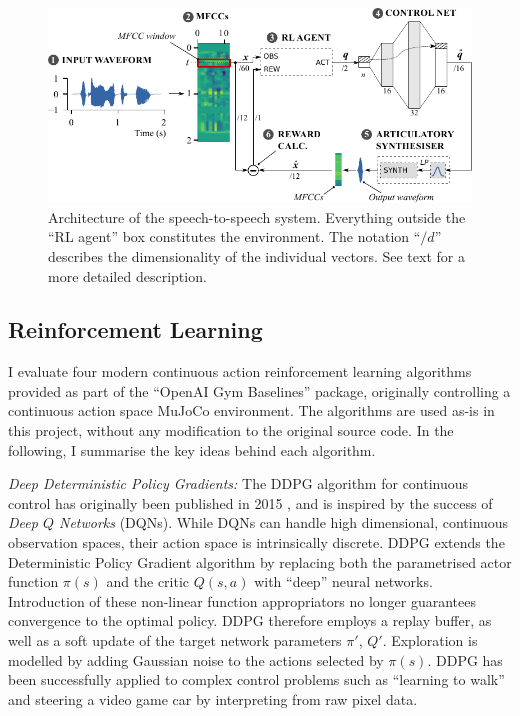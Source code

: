 \documentclass[letterpaper,10pt,conference]{ieeeconf}
\begin{document}
\begin{figure}[t]
	\centering
	\includegraphics{media/overview.pdf}
	\caption{Architecture of the speech-to-speech system. Everything outside the \enquote{RL agent} box constitutes the environment. The notation \enquote{$/d$} describes the dimensionality of the individual vectors. See text for a more detailed description.}
	\label{fig:architecture}
\end{figure}

\subsection{Reinforcement Learning}

I evaluate four modern continuous action reinforcement learning algorithms provided as part of the \enquote{OpenAI Gym Baselines} package, originally controlling a continuous action space MuJoCo environment. The algorithms are used as-is in this project, without any modification to the original source code. In the following, I summarise the key ideas behind each algorithm.

\emph{Deep Deterministic Policy Gradients:} The DDPG algorithm for continuous control has originally been published in 2015 \cite{lillicrap2015continuous}, and is inspired by the success of \emph{Deep $Q$ Networks} (DQNs). While DQNs can handle high dimensional, continuous observation spaces, their action space is intrinsically discrete. DDPG extends the Deterministic Policy Gradient algorithm by replacing both the parametrised actor function $\pi(s)$ and the critic $Q(s, a)$ with \enquote{deep} neural networks. Introduction of these non-linear function appropriators no longer guarantees convergence to the optimal policy. DDPG therefore employs a replay buffer, as well as a soft update of the target network parameters $\pi'$, $Q'$. Exploration is modelled by adding Gaussian noise to the actions selected by $\pi(s)$. DDPG has been successfully applied to complex control problems such as \enquote{learning to walk} and steering a video game car by interpreting from raw pixel data.
\end{document}
